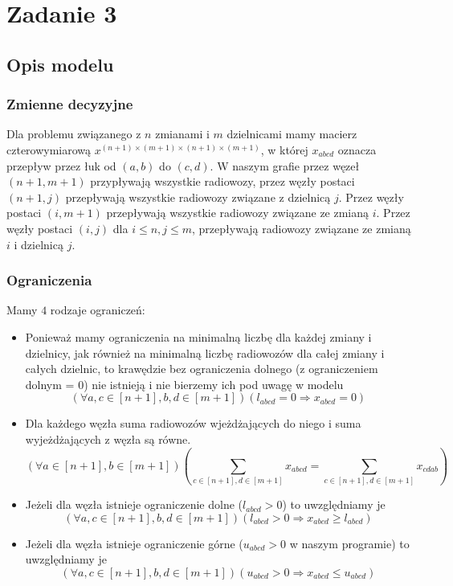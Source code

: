 \documentclass{article}
\begin{document}
\section{Zadanie 3}
\subsection{Opis modelu}
\subsubsection{Zmienne decyzyjne}
Dla problemu związanego z $n$ zmianami i $m$ dzielnicami mamy macierz czterowymiarową $x^{(n+1)\times(m+1)\times(n+1)\times(m+1)}$, w której $x_{abcd}$ oznacza przepływ przez łuk od $(a,b)$ do $(c,d)$. 
W naszym grafie przez węzeł $(n+1,m+1)$ przypływają wszystkie radiowozy, przez węzły postaci $(n+1,j)$ przepływają wszystkie radiowozy związane z dzielnicą $j$. Przez węzły postaci $(i, m+1)$ przepływają wszystkie radiowozy związane ze zmianą $i$. Przez węzły postaci $(i,j)$ dla $i\leq n, j\leq m$, przepływają radiowozy związane ze zmianą $i$ i dzielnicą $j$.


\subsubsection{Ograniczenia}
Mamy $4$ rodzaje ograniczeń:
\begin{itemize}
\item Ponieważ mamy ograniczenia na minimalną liczbę dla każdej zmiany i dzielnicy, jak również na minimalną liczbę radiowozów dla całej zmiany i całych dzielnic, to krawędzie bez ograniczenia dolnego (z ograniczeniem dolnym = 0) nie istnieją i nie bierzemy ich pod uwagę w modelu
$$(\forall a,c\in [n+1], b,d\in[m+1])(l_{abcd} = 0 \Rightarrow x_{abcd} = 0)$$
\item Dla każdego węzła suma radiowozów wjeżdżających do niego i suma wyjeżdżających z węzła są równe.
$$(\forall a\in [n+1], b\in[m+1])\left(\sum_{c\in[n+1],d\in[m+1]}x_{abcd} =\sum_{c\in[n+1],d\in[m+1]}x_{cdab} \right)$$ 
\item Jeżeli dla węzła istnieje ograniczenie dolne ($l_{abcd} > 0$) to uwzględniamy je
$$(\forall a,c\in [n+1], b,d\in[m+1])(l_{abcd} > 0 \Rightarrow x_{abcd} \geq l_{abcd})$$
\item Jeżeli dla węzła istnieje ograniczenie górne ($u_{abcd} > 0$ w naszym programie) to uwzględniamy je
$$(\forall a,c\in [n+1], b,d\in[m+1])(u_{abcd} > 0 \Rightarrow x_{abcd} \leq u_{abcd})$$
\end{itemize}
\end{document}
